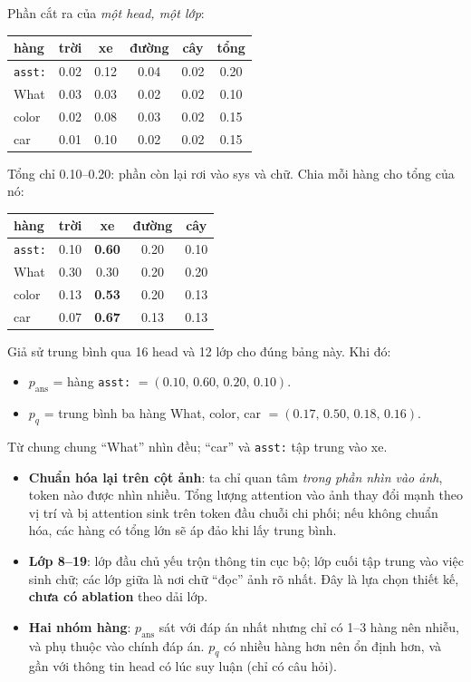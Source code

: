\documentclass[11pt,a4paper]{article}
\begin{document}
\begin{vidu}[: từ bảng tới phân phối, $N=4$ (trời, xe, đường, cây)]
Phần cắt ra của \emph{một head, một lớp}:
\begin{center}
\begin{tabular}{@{}lccccc@{}}
\toprule
hàng & trời & xe & đường & cây & tổng\\
\midrule
\texttt{asst:} & 0.02 & 0.12 & 0.04 & 0.02 & 0.20\\
What & 0.03 & 0.03 & 0.02 & 0.02 & 0.10\\
color & 0.02 & 0.08 & 0.03 & 0.02 & 0.15\\
car & 0.01 & 0.10 & 0.02 & 0.02 & 0.15\\
\bottomrule
\end{tabular}
\end{center}
Tổng chỉ 0.10--0.20: phần còn lại rơi vào sys và chữ. Chia mỗi hàng cho tổng của nó:
\begin{center}
\begin{tabular}{@{}lcccc@{}}
\toprule
hàng & trời & xe & đường & cây\\
\midrule
\texttt{asst:} & 0.10 & \textbf{0.60} & 0.20 & 0.10\\
What & 0.30 & 0.30 & 0.20 & 0.20\\
color & 0.13 & \textbf{0.53} & 0.20 & 0.13\\
car & 0.07 & \textbf{0.67} & 0.13 & 0.13\\
\bottomrule
\end{tabular}
\end{center}
Giả sử trung bình qua 16 head và 12 lớp cho đúng bảng này. Khi đó:
\begin{itemize}
\item $p_\text{ans}$ = hàng \texttt{asst:} $=(0.10,\,0.60,\,0.20,\,0.10)$.
\item $p_q$ = trung bình ba hàng What, color, car $=(0.17,\,0.50,\,0.18,\,0.16)$.
\end{itemize}
Từ chung chung ``What'' nhìn đều; ``car'' và \texttt{asst:} tập trung vào xe.
\end{vidu}

\begin{visao}
\begin{itemize}
\item \textbf{Chuẩn hóa lại trên cột ảnh}: ta chỉ quan tâm \emph{trong phần nhìn vào ảnh}, token nào được nhìn nhiều. Tổng lượng attention vào ảnh thay đổi mạnh theo vị trí và bị attention sink trên token đầu chuỗi chi phối; nếu không chuẩn hóa, các hàng có tổng lớn sẽ áp đảo khi lấy trung bình.
\item \textbf{Lớp 8--19}: lớp đầu chủ yếu trộn thông tin cục bộ; lớp cuối tập trung vào việc sinh chữ; các lớp giữa là nơi chữ ``đọc'' ảnh rõ nhất. Đây là lựa chọn thiết kế, \textbf{chưa có ablation} theo dải lớp.
\item \textbf{Hai nhóm hàng}: $p_\text{ans}$ sát với đáp án nhất nhưng chỉ có 1--3 hàng nên nhiễu, và phụ thuộc vào chính đáp án. $p_q$ có nhiều hàng hơn nên ổn định hơn, và gần với thông tin head có lúc suy luận (chỉ có câu hỏi).
\end{itemize}
\end{visao}
\end{document}
